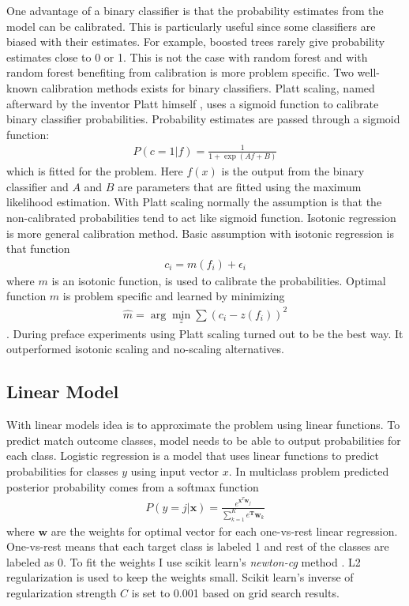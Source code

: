 One advantage of a binary classifier is that the probability estimates from the model can be calibrated. This is particularly useful since some classifiers are biased with their estimates. For example, boosted trees rarely give probability estimates close to 0 or 1. This is not the case with random forest and with random forest benefiting from calibration is more problem specific. \cite{niculescu2005predicting} Two well-known calibration methods exists for binary classifiers. Platt scaling, named afterward by the inventor Platt himself \cite{platt1999probabilistic}, uses a sigmoid function to calibrate binary classifier probabilities. Probability estimates are passed through a sigmoid function:
\begin{align*}
P ( c = 1 | f ) = \frac { 1 } { 1 + \exp ( A f + B ) }
\end{align*}
which is fitted for the problem. Here $f(x)$ is the output from the binary classifier and $A$ and $B$ are parameters that are fitted using the maximum likelihood estimation. With Platt scaling normally the assumption is that the non-calibrated probabilities tend to act like sigmoid function. Isotonic regression is more general calibration method. Basic assumption with isotonic regression is that function
\begin{align*}
c _ { i } = m \left( f _ { i } \right) + \epsilon _ { i }
\end{align*}
where $m$ is an isotonic function, is used to calibrate the probabilities. Optimal function $m$ is problem specific and learned by minimizing
\begin{align*}
\hat { m } = \arg \min _ { z } \sum \left( c _ { i } - z \left( f _ { i } \right) \right) ^ { 2 }
\end{align*}
. \cite{zadrozny2002transforming} During preface experiments using Platt scaling turned out to be the best way. It outperformed isotonic scaling and no-scaling alternatives.

\subsection{Linear Model}
With linear models idea is to approximate the problem using linear functions. To predict match outcome classes, model needs to be able to output probabilities for each class. Logistic regression is a model that uses linear functions to predict probabilities for classes $y$ using input vector $x$. In multiclass problem predicted posterior probability comes from a softmax function
\begin{align*}
P ( y = j | \mathbf { x } ) = \frac { e ^ { \mathbf { x } ^ { T } \mathbf { w } _ { j } } } { \sum _ { k = 1 } ^ { K } e ^ { \mathbf { T } } \mathbf { w } _ { k } }
\end{align*}
where $\mathbf{w}$ are the weights for optimal vector for each one-vs-rest linear regression. One-vs-rest means that each target class is labeled 1 and rest of the classes are labeled as 0. \cite{friedman2001elements} To fit the weights I use scikit learn's \textit{newton-cg} method \cite{scipy}. L2 regularization is used to keep the weights small. Scikit learn's inverse of regularization strength $C$ is set to 0.001 based on grid search results.

